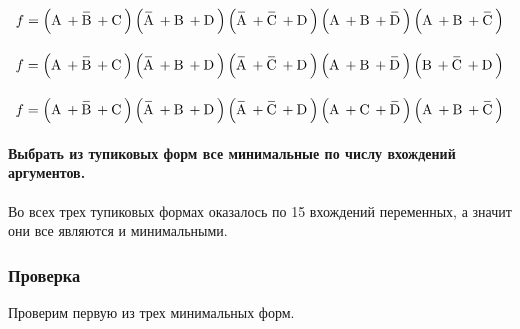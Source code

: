\documentclass[a4paper, 14pt]{extarticle}
\begin{document}
\begin{align*}
  f = \left(\NOV{A} + \OV{B} + \NOV{C}\right) \left(\OV{A} + \NOV{B} + \NOV{D}\right)
  \left(\OV{A} + \OV{C} + \NOV{D}\right) \left(\NOV{A} + \NOV{B} + \OV{D}\right)
  \left(\NOV{A} + \NOV{B} + \OV{C}\right) \\[1em]
  f = \left(\NOV{A} + \OV{B} + \NOV{C}\right) \left(\OV{A} + \NOV{B} + \NOV{D}\right)
  \left(\OV{A} + \OV{C} + \NOV{D}\right) \left(\NOV{A} + \NOV{B} + \OV{D}\right)
  \left(\NOV{B} + \OV{C} + \NOV{D}\right) \\[1em]
  f = \left(\NOV{A} + \OV{B} + \NOV{C}\right) \left(\OV{A} + \NOV{B} + \NOV{D}\right)
  \left(\OV{A} + \OV{C} + \NOV{D}\right) \left(\NOV{A} + \NOV{C} + \OV{D}\right)
  \left(\NOV{A} + \NOV{B} + \OV{C}\right) \\
\end{align*}

\paragraph{Выбрать из тупиковых форм все минимальные по числу вхождений аргументов.}

Во всех трех тупиковых формах оказалось по 15 вхождений переменных, а значит они 
все являются и минимальными.

\subsubsection{Проверка}

Проверим первую из трех минимальных форм.
\end{document}
